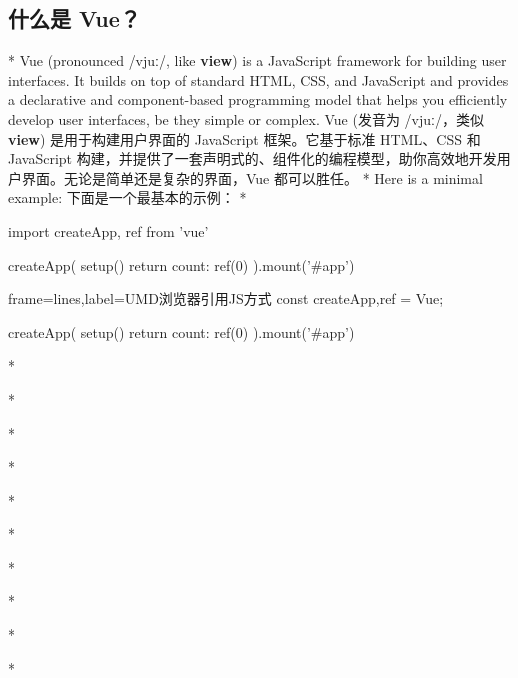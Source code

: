 \begin{paracol}{2}
\subsection{什么是 Vue？}
\switchcolumn[0]*%
Vue (pronounced {\fontGentiumPlus /vjuː/}, like \textbf{view}) is a JavaScript framework
for building user interfaces. It builds on top of standard HTML, CSS,
and JavaScript and provides a declarative and component-based
programming model that helps you efficiently develop user interfaces, be
they simple or complex.
\switchcolumn
Vue (发音为 {\fontGentiumPlus /vjuː/}，类似 \textbf{view}) 是用于构建用户界面的
JavaScript 框架。它基于标准 HTML、CSS 和 JavaScript
构建，并提供了一套声明式的、组件化的编程模型，助你高效地开发用户界面。无论是简单还是复杂的界面，Vue
都可以胜任。
\switchcolumn[0]*%
Here is a minimal example:
\switchcolumn
下面是一个最基本的示例：
\switchcolumn[0]*%
\begin{codeJs}
import { createApp, ref } from 'vue'

createApp({
  setup() {
    return {
      count: ref(0)
    }
  }
}).mount('#app')
\end{codeJs}
\switchcolumn
\begin{codeJs*}{frame=lines,label={UMD浏览器引用JS方式}}
const {createApp,ref} = Vue;

createApp({
    setup() {
    return {
        count: ref(0)
    }
    }
}).mount('#app')
\end{codeJs*}
\switchcolumn[0]*%

\switchcolumn

\switchcolumn[0]*%

\switchcolumn

\switchcolumn[0]*%

\switchcolumn

\switchcolumn[0]*%

\switchcolumn

\switchcolumn[0]*%

\switchcolumn

\switchcolumn[0]*%

\switchcolumn

\switchcolumn[0]*%

\switchcolumn

\switchcolumn[0]*%

\switchcolumn

\switchcolumn[0]*%

\switchcolumn

\switchcolumn[0]*%


\end{paracol}
